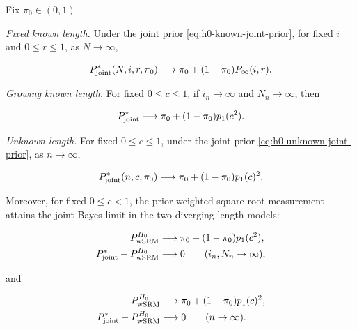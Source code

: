 \begin{theorem}
\label{thm:h0-localization}
Fix \(\pi_0\in(0,1)\).

\emph{Fixed known length.}
Under the joint prior \eqref{eq:h0-known-joint-prior}, for fixed \(i\) and
\(0\le r\le1\), as \(N\to\infty\),

\begin{equation}\label{eq:h0-fixed-limit}
P_{\rm joint}^*(N,i,r,\pi_0)
\longrightarrow
\pi_0+(1-\pi_0)P_\infty(i,r).
\end{equation}

\emph{Growing known length.}
For fixed \(0\le c\le1\), if \(i_n\to\infty\) and \(N_n\to\infty\),
then

\begin{equation}\label{eq:h0-growing-limit}
P_{\rm joint}^*
\longrightarrow
\pi_0+(1-\pi_0)p_1(c^2).
\end{equation}

\emph{Unknown length.}
For fixed \(0\le c\le1\), under the joint prior
\eqref{eq:h0-unknown-joint-prior}, as \(n\to\infty\),

\begin{equation}\label{eq:h0-unknown-limit}
P_{\rm joint}^*(n,c,\pi_0)
\longrightarrow
\pi_0+(1-\pi_0)p_1(c)^2.
\end{equation}

Moreover, for fixed \(0\le c<1\), the prior weighted square root measurement
attains the joint Bayes limit in the two diverging-length models:

\begin{equation}\label{eq:h0-growing-weighted-srm-limit}
\begin{aligned}
P_{\rm wSRM}^{H_0}
&\longrightarrow\pi_0+(1-\pi_0)p_1(c^2),\\
P_{\rm joint}^*-P_{\rm wSRM}^{H_0}
&\longrightarrow0
\qquad(i_n,N_n\to\infty),
\end{aligned}
\end{equation}

and

\begin{equation}\label{eq:h0-unknown-weighted-srm-limit}
\begin{aligned}
P_{\rm wSRM}^{H_0}
&\longrightarrow\pi_0+(1-\pi_0)p_1(c)^2,\\
P_{\rm joint}^*-P_{\rm wSRM}^{H_0}
&\longrightarrow0
\qquad(n\to\infty).
\end{aligned}
\end{equation}
\end{theorem}

